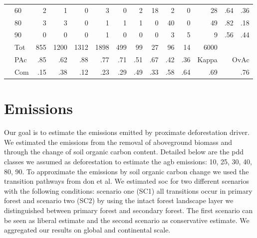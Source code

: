 \begin{table}[ht]
\begin{tabular}{llrrrrrrrrrrrr}
					& 60 & 2 & 1 & 0 & 3 & 0 & 2 & 18 & 2 & 0 & 28 & .64 & .36 \\ 
					& 80 & 3 & 3 & 0 & 1 & 1 & 1 & 0 & 40 & 0 & 49 & .82 & .18 \\ 
					& 90 & 0 & 0 & 0 & 1 & 0 & 0 & 0 & 3 & 5 & 9 & .56 & .44 \\\hline 
					& Tot & 855 & 1200 & 1312 & 1898 & 499 & 99 & 27 & 96 & 14 & 6000 & & \\
					& PAc & .85 & .62 & .88 & .77 & .71 & .51 & .67 & .42 & .36 & Kappa & \multicolumn{2}{r}{OvAc} \\
					& Com & .15 & .38 & .12 & .23 & .29 & .49 & .33 & .58 & .64 & .69 & \multicolumn{2}{r}{.76} \\ \hline
				\end{tabular}
			\end{table}

	\section{Emissions}
		 Our goal is to estimate the emissions emitted by proximate deforestation driver. We estimated the emissions from the removal of aboveground biomass and through the change of soil organic carbon content. Detailed below are the pdd classes we assumed as deforestation to estimate the agb emissions: 10, 25, 30, 40, 80, 90. To approximate the emissions by soil organic carbon change we used the transition pathways from don et al. We estimated soc for two different scenarios with the following conditions: scenario one (SC1) all transitions occur in primary forest and scenario two (SC2) by using the intact forest landscape layer we distinguished between primary forest and secondary forest. The first scenario can be seen as liberal estimate and the second scenario as conservative estimate. We aggregated our results on global and continental scale. 

